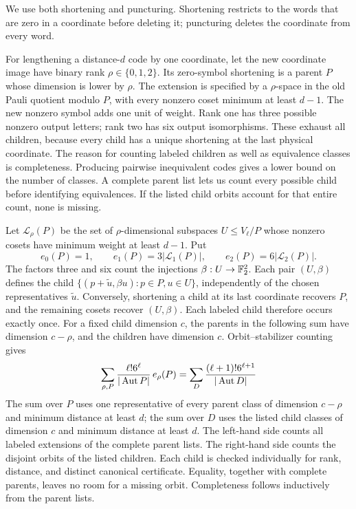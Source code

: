 We use both shortening and puncturing. Shortening restricts to the
words that are zero in a coordinate before deleting it; puncturing
deletes the coordinate from every word.

For lengthening a distance-\(d\) code by one coordinate, let the new
coordinate image have binary rank \(\rho\in\{0,1,2\}\). Its zero-symbol
shortening is a parent \(P\) whose dimension is lower by \(\rho\).
The extension is specified by a \(\rho\)-space in the old Pauli quotient
modulo \(P\), with every nonzero coset minimum at least \(d-1\).
The new nonzero symbol adds one unit of weight. Rank one has three
possible nonzero output letters; rank two has six output isomorphisms.
These exhaust all children, because every child has a unique shortening
at the last physical coordinate.
The reason for counting labeled children as well as equivalence classes
is completeness. Producing pairwise inequivalent codes gives a lower
bound on the number of classes. A complete parent list lets us count
every possible child before identifying equivalences. If the listed
child orbits account for that entire count, none is missing.

Let \(\mathcal L_\rho(P)\) be the set of \(\rho\)-dimensional subspaces
\(U\leq V_\ell/P\) whose nonzero cosets have minimum weight at least
\(d-1\). Put
\[
 e_0(P)=1,\qquad e_1(P)=3|\mathcal L_1(P)|,\qquad
 e_2(P)=6|\mathcal L_2(P)|.
\]
The factors three and six count the injections \(\beta:U\to\mathbb F_2^2\).
Each pair \((U,\beta)\) defines the child
\(\{(p+\widetilde u,\beta u):p\in P,u\in U\}\), independently
of the chosen representatives \(\widetilde u\).
Conversely, shortening a child at its last coordinate recovers \(P\),
and the remaining cosets recover \((U,\beta)\). Each labeled child
therefore occurs exactly once. For a fixed child dimension \(c\), the
parents in the following sum have dimension \(c-\rho\), and the
children have dimension \(c\). Orbit--stabilizer counting gives
\begin{equation}\label{eq:lengthening-mass}
 \sum_{\rho,P}\frac{\ell!6^\ell}{|\operatorname{Aut} P|}\,e_\rho(P)
 =\sum_D\frac{(\ell+1)!6^{\ell+1}}{|\operatorname{Aut} D|}
\end{equation}
The sum over \(P\) uses one representative of every parent class of
dimension \(c-\rho\) and minimum distance at least \(d\); the sum
over \(D\) uses the listed child classes of dimension \(c\) and
minimum distance at least \(d\).
The left-hand side counts all labeled extensions of the complete parent
lists. The right-hand side counts the disjoint orbits of the listed children. Each child is checked individually for rank, distance, and
distinct canonical certificate. Equality, together with complete parents,
leaves no room for a missing orbit. Completeness follows inductively from the parent lists.


